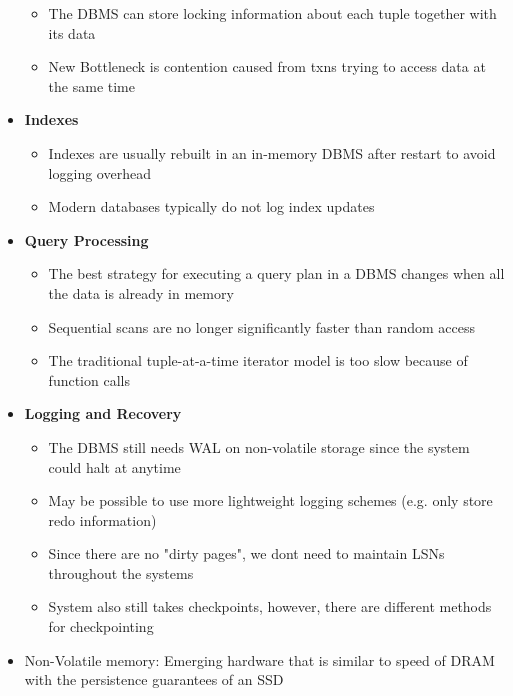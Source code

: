 \documentclass[11pt]{article}
\begin{document}
\begin{itemize}
\begin{itemize}
        \item The DBMS can store locking information about each tuple together with its data
        \item New Bottleneck is contention caused from txns trying to access data at the same time
    \end{itemize}
    \item \textbf{Indexes}
    \begin{itemize}
        \item Indexes are usually rebuilt in an in-memory DBMS after restart to avoid logging overhead
        \item Modern databases typically do not log index updates
    \end{itemize}
    \item \textbf{Query Processing}
    \begin{itemize}
        \item The best strategy for executing a query plan in a DBMS changes when all the data is already in memory
        \item Sequential scans are no longer significantly faster than random access
        \item The traditional tuple-at-a-time iterator model is too slow because of function calls
    \end{itemize}
    \item \textbf{Logging and Recovery}
    \begin{itemize}
        \item The DBMS still needs WAL on non-volatile storage since the system could halt at anytime
        \item May be possible to use more lightweight logging schemes (e.g. only store redo information)
        \item Since there are no "dirty pages", we dont need to maintain LSNs throughout the systems
        \item System also still takes checkpoints, however, there are different methods for checkpointing
    \end{itemize}
    \item Non-Volatile memory: Emerging hardware that is similar to speed of DRAM with the persistence guarantees of an SSD

\end{itemize}
\end{document}
